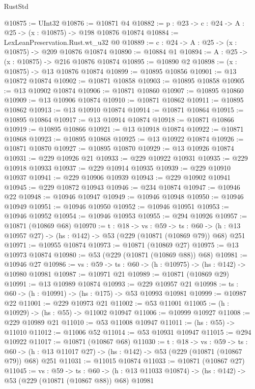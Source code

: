 \begin{lexlean}{RustStd}
\begin{coremodule}
@10875 := UInt32
@10876 := @10871 @4
@10882 := {p : @23} -> {c : @24} -> {A : @25} -> (x : @10875) -> @198 @10876 @10874
@10884 := LexLeanPreservation.Rust.wt_u32 @0
@10889 := {c : @24} -> {A : @25} -> (x : @10875) -> @209 @10876 @10874
@10890 := @10884 @1
@10894 := {A : @25} -> (x : @10875) -> @216 @10876 @10874
@10895 := @10890 @2
@10898 := (x : @10875) -> @13 @10876 @10874
@10899 := @10895 @10856
@10901 := @13 @10872 @10874
@10902 := @10871 @10858
@10903 := @10895 @10858
@10905 := @13 @10902 @10874
@10906 := @10871 @10860
@10907 := @10895 @10860
@10909 := @13 @10906 @10874
@10910 := @10871 @10862
@10911 := @10895 @10862
@10913 := @13 @10910 @10874
@10914 := @10871 @10864
@10915 := @10895 @10864
@10917 := @13 @10914 @10874
@10918 := @10871 @10866
@10919 := @10895 @10866
@10921 := @13 @10918 @10874
@10922 := @10871 @10868
@10923 := @10895 @10868
@10925 := @13 @10922 @10874
@10926 := @10871 @10870
@10927 := @10895 @10870
@10929 := @13 @10926 @10874
@10931 := @229 @10926 @21
@10933 := @229 @10922 @10931
@10935 := @229 @10918 @10933
@10937 := @229 @10914 @10935
@10939 := @229 @10910 @10937
@10941 := @229 @10906 @10939
@10943 := @229 @10902 @10941
@10945 := @229 @10872 @10943
@10946 := @234 @10874
@10947 := @10946 @22
@10948 := @10946 @10947
@10949 := @10946 @10948
@10950 := @10946 @10949
@10951 := @10946 @10950
@10952 := @10946 @10951
@10953 := @10946 @10952
@10954 := @10946 @10953
@10955 := @294 @10926
@10957 := @10871 (@10869 @68)
@10970 := {t : @18} ->
  {vs : @59} ->
  {ts : @60} -> (h : @13 @10957 @27) -> (hs : @142) -> @53 (@229 (@10871 (@10869 @79)) @68) @251
@10971 := @10955 @10874
@10973 := @10871 (@10869 @27)
@10975 := @13 @10973 @10874
@10980 := @53 (@229 (@10871 (@10869 @88)) @68)
@10981 := @10946 @27
@10986 := {vs : @59} -> {ts : @60} -> (h : @10975) -> (hs : @142) -> @10980 @10981
@10987 := @10971 @21
@10989 := @10871 (@10869 @29)
@10991 := @13 @10989 @10874
@10993 := @229 @10957 @21
@10998 := {ts : @60} -> (h : @10991) -> (hs : @175) -> @53 @10993 @10981
@10999 := @10987 @22
@11001 := @229 @10973 @21
@11002 := @53 @11001
@11005 := (h : @10929) -> (hs : @55) -> @11002 @10947
@11006 := @10999 @10927
@11008 := @229 @10989 @21
@11010 := @53 @11008 @10947
@11011 := (hs : @55) -> @11010
@11012 := @11006 @52
@11014 := @53 @10931 @10947
@11015 := @294 @10922
@11017 := @10871 (@10867 @68)
@11030 := {t : @18} ->
  {vs : @59} ->
  {ts : @60} -> (h : @13 @11017 @27) -> (hs : @142) -> @53 (@229 (@10871 (@10867 @79)) @68) @251
@11031 := @11015 @10874
@11033 := @10871 (@10867 @27)
@11045 := {vs : @59} ->
  {ts : @60} ->
  (h : @13 @11033 @10874) -> (hs : @142) -> @53 (@229 (@10871 (@10867 @88)) @68) @10981

\end{coremodule}
\end{lexlean}
